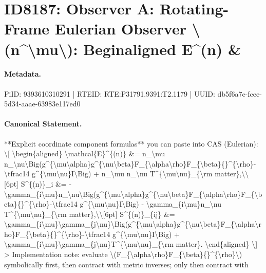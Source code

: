 \section*{ID8187: Observer A: Rotating-Frame Eulerian Observer \textbackslash{}(n\textasciicircum{}\textbackslash{}mu\textbackslash{}): Beginaligned E\textasciicircum{}(n) \&}
\paragraph{Metadata.}
PiID: 9393610310291 | RTEID: RTE:P31791.9391:T2.1179 | UUID: db5f6a7c-fcee-5d34-aaae-63983e117ed0

\paragraph{Canonical Statement.}
**Explicit coordinate component formulas** you can paste into CAS (Eulerian): \textbackslash{}[ \textbackslash{}begin\{aligned\} \textbackslash{}mathcal\{E\}\textasciicircum{}\{(n)\} \&= n\_\textbackslash{}mu n\_\textbackslash{}nu\textbackslash{}Big(g\textasciicircum{}\{\textbackslash{}mu\textbackslash{}alpha\}g\textasciicircum{}\{\textbackslash{}nu\textbackslash{}beta\}F\_\{\textbackslash{}alpha\textbackslash{}rho\}F\_\{\textbackslash{}beta\}\{\}\textasciicircum{}\{\textbackslash{}rho\}-\textbackslash{}tfrac14 g\textasciicircum{}\{\textbackslash{}mu\textbackslash{}nu\}I\textbackslash{}Big) + n\_\textbackslash{}mu n\_\textbackslash{}nu T\textasciicircum{}\{\textbackslash{}mu\textbackslash{}nu\}\_\{\textbackslash{}rm matter\},\textbackslash{}\textbackslash{}[6pt] S\textasciicircum{}\{(n)\}\_i \&= -\textbackslash{}gamma\_\{i\textbackslash{}mu\}n\_\textbackslash{}nu\textbackslash{}Big(g\textasciicircum{}\{\textbackslash{}mu\textbackslash{}alpha\}g\textasciicircum{}\{\textbackslash{}nu\textbackslash{}beta\}F\_\{\textbackslash{}alpha\textbackslash{}rho\}F\_\{\textbackslash{}beta\}\{\}\textasciicircum{}\{\textbackslash{}rho\}-\textbackslash{}tfrac14 g\textasciicircum{}\{\textbackslash{}mu\textbackslash{}nu\}I\textbackslash{}Big) - \textbackslash{}gamma\_\{i\textbackslash{}mu\}n\_\textbackslash{}nu T\textasciicircum{}\{\textbackslash{}mu\textbackslash{}nu\}\_\{\textbackslash{}rm matter\},\textbackslash{}\textbackslash{}[6pt] S\textasciicircum{}\{(n)\}\_\{ij\} \&= \textbackslash{}gamma\_\{i\textbackslash{}mu\}\textbackslash{}gamma\_\{j\textbackslash{}nu\}\textbackslash{}Big(g\textasciicircum{}\{\textbackslash{}mu\textbackslash{}alpha\}g\textasciicircum{}\{\textbackslash{}nu\textbackslash{}beta\}F\_\{\textbackslash{}alpha\textbackslash{}rho\}F\_\{\textbackslash{}beta\}\{\}\textasciicircum{}\{\textbackslash{}rho\}-\textbackslash{}tfrac14 g\textasciicircum{}\{\textbackslash{}mu\textbackslash{}nu\}I\textbackslash{}Big) + \textbackslash{}gamma\_\{i\textbackslash{}mu\}\textbackslash{}gamma\_\{j\textbackslash{}nu\}T\textasciicircum{}\{\textbackslash{}mu\textbackslash{}nu\}\_\{\textbackslash{}rm matter\}. \textbackslash{}end\{aligned\} \textbackslash{}] > Implementation note: evaluate \textbackslash{}(F\_\{\textbackslash{}alpha\textbackslash{}rho\}F\_\{\textbackslash{}beta\}\{\}\textasciicircum{}\{\textbackslash{}rho\}\textbackslash{}) symbolically first, then contract with metric inverses; only then contract with 